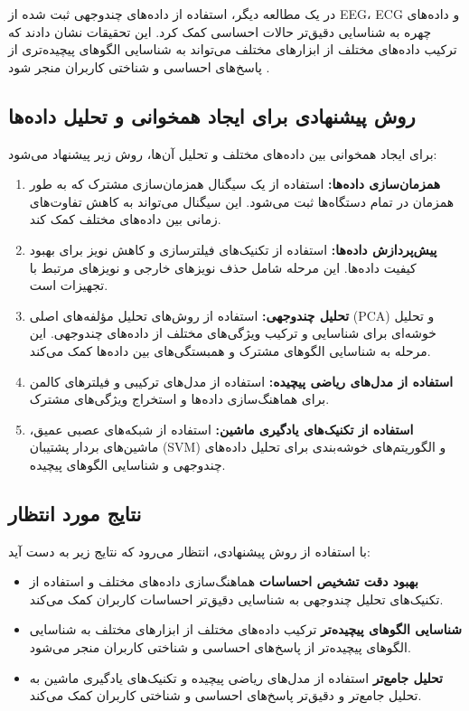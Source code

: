\documentclass[12pt]{article}
\begin{document}
در یک مطالعه دیگر، استفاده از داده‌های چندوجهی ثبت شده از EEG، ECG و داده‌های چهره به شناسایی دقیق‌تر حالات احساسی کمک کرد. این تحقیقات نشان دادند که ترکیب داده‌های مختلف از ابزارهای مختلف می‌تواند به شناسایی الگوهای پیچیده‌تری از پاسخ‌های احساسی و شناختی کاربران منجر شود \cite{Liu2018}.

\subsection{روش پیشنهادی برای ایجاد همخوانی و تحلیل داده‌ها}

برای ایجاد همخوانی بین داده‌های مختلف و تحلیل آن‌ها، روش زیر پیشنهاد می‌شود:

\begin{enumerate}
\item \textbf{همزمان‌سازی داده‌ها:}  استفاده از یک سیگنال همزمان‌سازی مشترک که به طور همزمان در تمام دستگاه‌ها ثبت می‌شود. این سیگنال می‌تواند به کاهش تفاوت‌های زمانی بین داده‌های مختلف کمک کند.
\item \textbf{پیش‌پردازش داده‌ها:}  استفاده از تکنیک‌های فیلترسازی و کاهش نویز برای بهبود کیفیت داده‌ها. این مرحله شامل حذف نویزهای خارجی و نویزهای مرتبط با تجهیزات است.
\item \textbf{تحلیل چندوجهی:}  استفاده از روش‌های تحلیل مؤلفه‌های اصلی (PCA) و تحلیل خوشه‌ای برای شناسایی و ترکیب ویژگی‌های مختلف از داده‌های چندوجهی. این مرحله به شناسایی الگوهای مشترک و همبستگی‌های بین داده‌ها کمک می‌کند.
\item \textbf{استفاده از مدل‌های ریاضی پیچیده:}  استفاده از مدل‌های ترکیبی و فیلترهای کالمن برای هماهنگ‌سازی داده‌ها و استخراج ویژگی‌های مشترک.
\item \textbf{استفاده از تکنیک‌های یادگیری ماشین:}  استفاده از شبکه‌های عصبی عمیق، ماشین‌های بردار پشتیبان (SVM) و الگوریتم‌های خوشه‌بندی برای تحلیل داده‌های چندوجهی و شناسایی الگوهای پیچیده.
\end{enumerate}
\subsection{نتایج مورد انتظار}

با استفاده از روش پیشنهادی، انتظار می‌رود که نتایج زیر به دست آید:
\begin{itemize}

\item \textbf{بهبود دقت تشخیص احساسات}  هماهنگ‌سازی داده‌های مختلف و استفاده از تکنیک‌های تحلیل چندوجهی به شناسایی دقیق‌تر احساسات کاربران کمک می‌کند.
\item \textbf{شناسایی الگوهای پیچیده‌تر}  ترکیب داده‌های مختلف از ابزارهای مختلف به شناسایی الگوهای پیچیده‌تر از پاسخ‌های احساسی و شناختی کاربران منجر می‌شود.
\item \textbf{تحلیل جامع‌تر}  استفاده از مدل‌های ریاضی پیچیده و تکنیک‌های یادگیری ماشین به تحلیل جامع‌تر و دقیق‌تر پاسخ‌های احساسی و شناختی کاربران کمک می‌کند.
\end{itemize}
\end{document}
